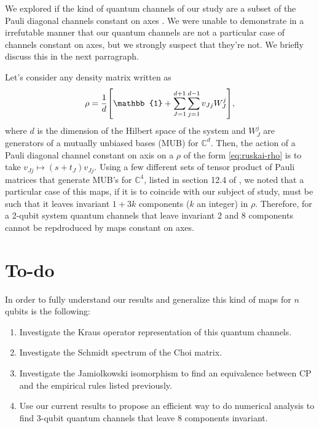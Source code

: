 \documentclass[11pt,dvipsnames]{article} %
\begin{document}
We explored if the kind of quantum channels of our study are a subset 
of the Pauli diagonal channels constant on axes \cite{nathanson2007pauli}.
We were unable to demonstrate in a irrefutable manner that 
our quantum channels are not a particular case of channels constant on axes, 
but we strongly suspect that they're not. We briefly discuss this in the 
next parragraph. 

Let's consider any density matrix written as
\begin{align}
	\rho = \frac{1}{d}\qty[\mathbb{1} + \sum _{J=1}^{d+1} \sum _{j=1}^{d-1}
	v_{Jj}W_J^j],
	\label{eq:ruskai-rho}
\end{align}
where $d$ is the dimension of the Hilbert space of the system and $W_J^j$ 
are generators of a mutually unbiased bases (MUB) for $\mathbb{C}^{d}$. Then,
the action of a Pauli diagonal channel constant on axis on a $\rho$ of the form
\eqref{eq:ruskai-rho} is to take $v_{Jj}\mapsto (s+t_J)v_{Jj}$. Using a few
different sets of tensor product of Pauli matrices that generate MUB's for
$\mathbb{C}^4$, listed in section 12.4 of \cite{bengtsson_zyczkowski_2017}, 
we noted that a particular case of this maps, if it is to coincide with our subject of
study, must be such that it leaves invariant $1+3k$ components ($k$ an integer)
in $\rho$. Therefore, for a 2-qubit system quantum channels that leave 
invariant 2 and 8 components cannot be repdroduced by maps constant on axes. 

\section*{To-do}
In order to fully understand our results and generalize this kind of maps 
for $n$ qubits is the following:
\begin{enumerate}
	\item Investigate the Kraus operator representation of this quantum channels.
	\item Investigate the Schmidt spectrum of the Choi matrix.
	\item Investigate the Jamiolkowski isomorphism to find an equivalence
				between CP and the empirical rules listed previously.
	\item Use our current results to propose an efficient way to do numerical
				analysis to find 3-qubit quantum channels that leave 8 components 
				invariant.
\end{enumerate}



\vfill
\end{document}
